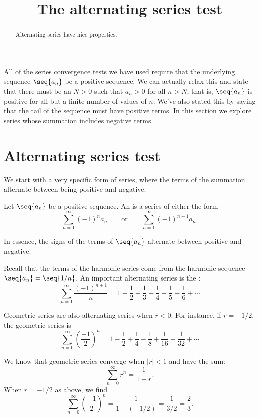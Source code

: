 \documentclass{ximera}
\title[Dig-In:]{The alternating series test}
\begin{document}
\begin{abstract}
  Alternating series have nice properties.
\end{abstract}
\maketitle

All of the series convergence tests we have used require that the
underlying sequence $\seq{a_n}$ be a positive sequence. We can
actually relax this and state that there must be an $N>0$ such that
$a_n>0$ for all $n>N$; that is, $\seq{a_n}$ is positive for all but a
finite number of values of $n$.  We've also stated this by saying that 
the tail of the sequence must have positive terms. In this section we explore series
whose summation includes negative terms.


\section{Alternating series test}

We start with a very specific form of series, where the terms of the
summation alternate between being positive and negative.

\begin{definition}
Let $\seq{a_n}$ be a positive sequence. An  is
a series of either the form 
\[
\sum_{n=1}^\infty (-1)^na_n\qquad \text{or}\qquad \sum_{n=1}^\infty (-1)^{n+1}a_n.
\]
\end{definition}

In essence, the signs of the terms of $\seq{a_n}$ alternate between 
positive and negative.

Recall that the terms of the harmonic series come from the harmonic sequence
$\seq{a_n} = \seq{1/n}$. An important alternating series is the
:
\[
\sum_{n=1}^\infty \frac{(-1)^{n+1}}{n} = 1-\frac12+\frac13-\frac14+\frac15-\frac16+\cdots
\]

Geometric series are also alternating series when $r<0$. For
instance, if $r=-1/2$, the geometric series is
\[
\sum_{n=0}^\infty \left(\frac{-1}{2}\right)^n = 1-\frac12+\frac14-\frac18+\frac1{16}-\frac1{32}+\cdots
\]

We know that geometric series converge when $|r|<1$ and have the sum:
\[
\sum_{n=0}^\infty r^n = \frac1{1-r}.
\]
When $r=-1/2$ as above, we find
\[
\sum_{n=0}^\infty \left(\frac{-1}{2}\right)^n = \frac1{1-(-1/2)} = \frac 1{3/2} = \frac23.
\]
\end{document}
